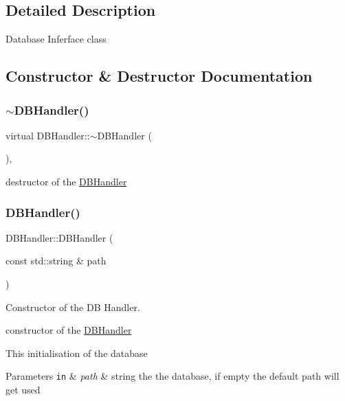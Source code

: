 \subsection{Detailed Description}
Database Inferface class 

\subsection{Constructor \& Destructor Documentation}
\mbox{\label{class_d_b_handler_a47f7963b489c9a50d9ed1ebad4427e92}} 
\subsubsection{\texorpdfstring{$\sim$\+D\+B\+Handler()}{~DBHandler()}}
{\footnotesize\ttfamily virtual D\+B\+Handler\+::$\sim$\+D\+B\+Handler (\begin{DoxyParamCaption}{ }\end{DoxyParamCaption})\hspace{0.3cm}{\ttfamily [virtual]}, {\ttfamily [default]}}

destructor of the \mbox{\hyperlink{class_d_b_handler}{D\+B\+Handler}} \mbox{\label{class_d_b_handler_a5b98990456fb4436208d835332ee7a3e}} 
\subsubsection{\texorpdfstring{D\+B\+Handler()}{DBHandler()}}
{\footnotesize\ttfamily D\+B\+Handler\+::\+D\+B\+Handler (\begin{DoxyParamCaption}\item[{const std\+::string \&}]{path }\end{DoxyParamCaption})\hspace{0.3cm}{\ttfamily [explicit]}}



Constructor of the DB Handler. 

constructor of the \mbox{\hyperlink{class_d_b_handler}{D\+B\+Handler}}

This initialisation of the database


\begin{DoxyParams}[1]{Parameters}
\mbox{\tt in}  & {\em path} & string the the database, if empty the default path will get used \\
\hline
\end{DoxyParams}


